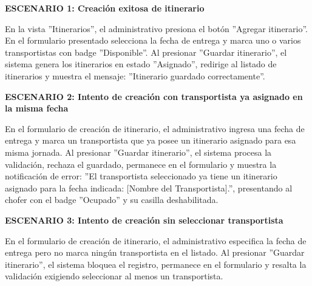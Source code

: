 \documentclass[a4paper,9pt]{article}
\begin{document}
\begin{tcolorbox}[hucard, title={\textbf{HU-13: AGREGAR ITINERARIO} \hfill \scriptsize \colorbox{tealstatus}{\textbf{\ Accepted\ }} \quad \colorbox{white}{\textcolor{primarydark}{\textbf{\ 5 pts\ }}}}]
{\footnotesize
\noindent\textbf{\textcolor{secondarydark}{ESCENARIO 1:  Creación exitosa de itinerario}}\par\vspace{1pt}
En la vista ''Itinerarios'', el administrativo presiona el botón ''Agregar itinerario''. En el formulario presentado selecciona la fecha de entrega y marca uno o varios transportistas con badge ''Disponible''. Al presionar ''Guardar itinerario'', el sistema genera los itinerarios en estado ''Asignado'', redirige al listado de itinerarios y muestra el mensaje: ''Itinerario guardado correctamente''.\par\vspace{2.5pt}
\noindent\textbf{\textcolor{secondarydark}{ESCENARIO 2:  Intento de creación con transportista ya asignado en la misma fecha}}\par\vspace{1pt}
En el formulario de creación de itinerario, el administrativo ingresa una fecha de entrega y marca un transportista que ya posee un itinerario asignado para esa misma jornada. Al presionar ''Guardar itinerario'', el sistema procesa la validación, rechaza el guardado, permanece en el formulario y muestra la notificación de error: ''El transportista seleccionado ya tiene un itinerario asignado para la fecha indicada: [Nombre del Transportista].'', presentando al chofer con el badge ''Ocupado'' y su casilla deshabilitada.\par\vspace{2.5pt}
\noindent\textbf{\textcolor{secondarydark}{ESCENARIO 3:  Intento de creación sin seleccionar transportista}}\par\vspace{1pt}
En el formulario de creación de itinerario, el administrativo especifica la fecha de entrega pero no marca ningún transportista en el listado. Al presionar ''Guardar itinerario'', el sistema bloquea el registro, permanece en el formulario y resalta la validación exigiendo seleccionar al menos un transportista.\par\vspace{2.5pt}
}\par
\end{tcolorbox}
\end{document}
